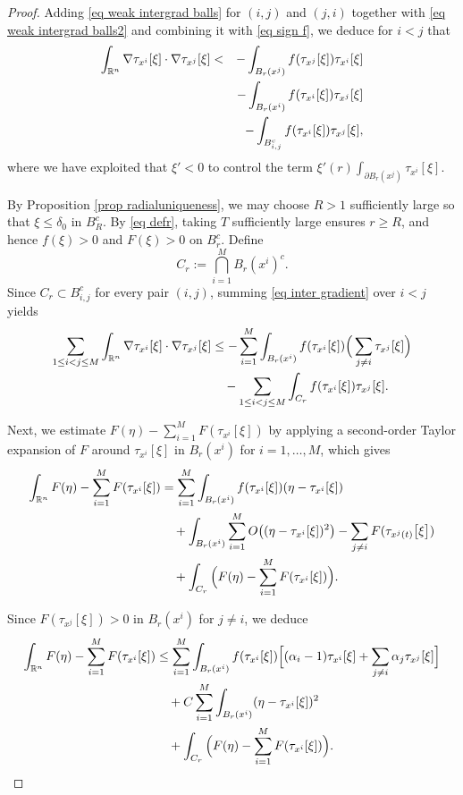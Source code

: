 \documentclass[11pt,letterpaper,reqno]{amsart}
\theoremstyle{plain}%
\theoremstyle{definition}
\numberwithin{equation}{section}
\numberwithin{figure}{section}
\begin{document}
\begin{proof}
Adding \eqref{eq weak intergrad balls} for $(i,j)$ and $(j,i)$ together with \eqref{eq weak intergrad balls2} and combining it with \eqref{eq sign f}, we deduce for $i<j$ that
\begin{eqnarray}\notag
\int_{\mathbb{R}^n} \nabla \tau_{x^i}[\xi]\cdot \nabla \tau_{x^j}[\xi]
&<& -\int_{B_r(x^j)} f(\tau_{x^j}[\xi]) \tau_{x^i}[\xi] \notag\\
&&- \int_{B_r(x^i)} f(\tau_{x^i}[\xi]) \tau_{x^j}[\xi] \notag\\
&&- \int_{B_{i,j}^c} f(\tau_{x^i}[\xi]) \tau_{x^j}[\xi],
\label{eq inter gradient}
\end{eqnarray}
where we have exploited that $\xi'<0$ to control the term $\xi'(r)\int_{\partial B_r(x^j)} \tau_{x^i}[\xi]$.

By Proposition \ref{prop radialuniqueness}, we may choose $R>1$ sufficiently large so that $\xi \le \delta_0$ in $B_R^c$. By \eqref{eq defr}, taking $T$ sufficiently large ensures $r \ge R$, and hence $f(\xi)>0$ and $F(\xi)>0$ on $B_r^c$. Define
\[
C_{r} := \bigcap_{i=1}^M B_r(x^i)^c.
\]
Since $C_r \subset B_{i,j}^c$ for every pair $(i,j)$, summing \eqref{eq inter gradient} over $i<j$ yields
\begin{align}\notag
\sum_{1\le i<j\le M} \int_{\mathbb{R}^n}
\nabla \tau_{x^i}[\xi]\cdot \nabla \tau_{x^j}[\xi]
&\le - \sum_{i=1}^M \int_{B_r(x^i)} f(\tau_{x^i}[\xi])
\Big(\sum_{j\neq i} \tau_{x^j}[\xi]\Big) \notag\\
&\quad - \sum_{1\le i<j\le M}
\int_{C_r} f(\tau_{x^i}[\xi]) \tau_{x^j}[\xi].
\label{eq added grad inter}
\end{align}

Next, we estimate $F(\eta)-\sum_{i=1}^M F(\tau_{x^i}[\xi])$ by applying a second-order Taylor expansion of $F$ around $\tau_{x^i}[\xi]$ in $B_r(x^i)$ for $i=1,\dots,M$, which gives
\begin{align}\notag
\int_{\mathbb{R}^n} F(\eta)
- \sum_{i=1}^M F(\tau_{x^i}[\xi])
&= \sum_{i=1}^M \int_{B_r(x^i)}
f(\tau_{x^i}[\xi])(\eta-\tau_{x^i}[\xi]) \notag\\
&\quad +  \int_{B_r(x^i)}\sum_{i=1}^M
O\big((\eta-\tau_{x^i}[\xi])^2\big)- \sum_{j \neq i} F(\tau_{x^j(t)}\big[\xi\big]) \notag\\
&\quad + \int_{C_r}
\Big(F(\eta)-\sum_{i=1}^M F(\tau_{x^i}[\xi])\Big).
\label{eq added potential}
\end{align}

Since $F(\tau_{x^j}[\xi])>0$ in $B_r(x^i)$ for $j\neq i$, we deduce
\begin{align}\notag
\int_{\mathbb{R}^n} F(\eta)
- \sum_{i=1}^M F(\tau_{x^i}[\xi])
&\le \sum_{i=1}^M \int_{B_r(x^i)}
f(\tau_{x^i}[\xi])
\Big[(\alpha_i-1)\tau_{x^i}[\xi]
+ \sum_{j\neq i}\alpha_j \tau_{x^j}[\xi]\Big] \notag\\
&\quad + C\sum_{i=1}^M
\int_{B_r(x^i)} (\eta-\tau_{x^i}[\xi])^2 \notag\\
&\quad + \int_{C_r}
\Big(F(\eta)-\sum_{i=1}^M F(\tau_{x^i}[\xi])\Big).
\label{eq added potential2}
\end{align}


\end{proof}
\end{document}
